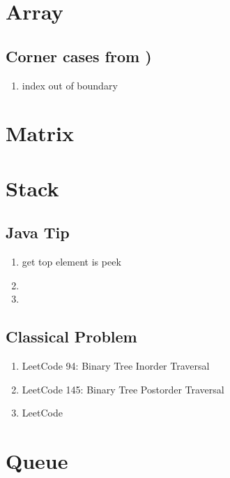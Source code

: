 \chapter{ Array }

\section {  Corner cases from )}
\begin{enumerate}
    \item index out of boundary


\end{enumerate}

\chapter{ Matrix }

\chapter{ Stack }

\section{ Java Tip }

\begin{enumerate}
    \item get top element is peek
    \item
    \item

\end{enumerate}

\section{ Classical Problem }

\begin{enumerate}
    \item LeetCode 94: Binary Tree Inorder Traversal
    \item LeetCode 145: Binary Tree Postorder Traversal
    \item LeetCode

\end{enumerate}

\chapter{ Queue }


